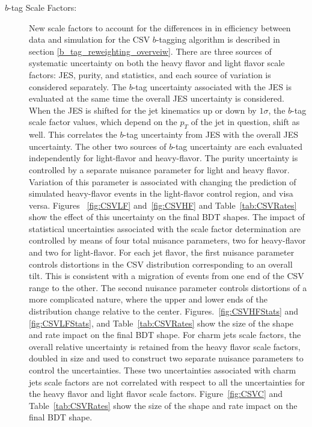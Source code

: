 \begin{description}
\item[$b$-tag Scale Factors:] New scale factors to account for the
  differences in in efficiency between data and simulation for the CSV
  $b$-tagging algorithm is described in section
  \ref{b_tag_reweighting_overveiw}.   There are three sources of
  systematic uncertainty on both the heavy flavor and light flavor
  scale factors: JES, purity, and statistics, and each source of
  variation is considered separately.  The $b$-tag uncertainty
  associated with the JES is evaluated at the same time the overall
  JES uncertainty is considered.  When the JES is shifted for the jet
  kinematics up or down by $1\sigma$, the $b$-tag scale factor values,
  which depend on the $p_{T}$ of the jet in question, shift as well.
  This correlates the $b$-tag uncertainty from JES with the overall
  JES uncertainty.  The other two sources of $b$-tag uncertainty are
  each evaluated independently for light-flavor and heavy-flavor.  The
  purity uncertainty is controlled by a separate nuisance parameter
  for light and heavy flavor.  Variation of this parameter is
  associated with changing the prediction of simulated heavy-flavor
  events in the light-flavor control region, and visa versa. Figures
  ~\ref{fig:CSVLF} and~\ref{fig:CSVHF} and Table~\ref{tab:CSVRates}
  show the effect of this uncertainty on the final BDT shapes.  The
  impact of statistical uncertainties associated with the scale factor
  determination are controlled by means of four total nuisance
  parameters, two for heavy-flavor and two for light-flavor.  For each
  jet flavor, the first nuisance parameter controls distortions in
  the CSV distribution corresponding to an overall tilt.  This is
  consistent with a migration of events from one end of the CSV range
  to the other.   The second nuisance parameter controls distortions of a more
  complicated nature, where the upper and lower ends of the
  distribution change relative to the center.
  Figures.~\ref{fig:CSVHFStats} and \ref{fig:CSVLFStats}, and
  Table~\ref{tab:CSVRates} show the size of the shape and rate impact
  on the final BDT shape.  For charm jets scale factors, the overall
  relative uncertainty is retained from the heavy flavor scale
  factors, doubled in size and used to construct two separate nuisance
  parameters to control the uncertainties. These two uncertainties
  associated with charm jets scale factors are not correlated with
  respect to all the uncertainties for the heavy flavor and light
  flavor scale factors. Figure~\ref{fig:CSVC} and
  Table~\ref{tab:CSVRates} show the size of the shape and rate impact
  on the final BDT shape.


\end{description}
